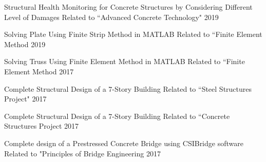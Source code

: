 



\begin{cvhonors}


  \cvhonor
    {Structural Health Monitoring for Concrete Structures by Considering Different Level of Damages} %
    {Related to “Advanced Concrete Technology"} %
    {} %
    {2019} %

\vspace{10pt}
  \cvhonor
    {Solving Plate Using Finite Strip Method in MATLAB} %
    {Related to “Finite Element Method} %
    {} %
    {2019} %

\vspace{10pt}    
  \cvhonor
    {Solving Truss Using Finite Element Method in MATLAB} %
    {Related to “Finite Element Method} %
    {} %
    {2017} %

\vspace{10pt}    
  \cvhonor
    {Complete Structural Design of a 7-Story Building} %
    {Related to “Steel Structures Project"} %
    {} %
    {2017} %
    
\vspace{10pt}   
  \cvhonor
    {Complete Structural Design of a 7-Story Building} %
    {Related to “Concrete Structures Project} %
    {} %
    {2017} %

\vspace{10pt}
  \cvhonor
    {Complete design of a Prestressed Concrete Bridge using CSIBridge software} %
    {Related to "Principles of Bridge Engineering} %
    {} %
    {2017} %
    

\end{cvhonors}
